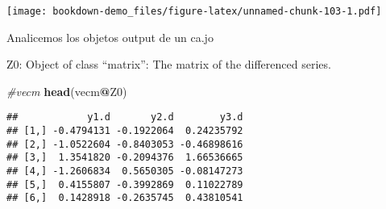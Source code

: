 \documentclass[]{book}
\newenvironment{Shaded}{\begin{snugshade}}{\end{snugshade}}
\newcommand{\KeywordTok}[1]{\textcolor[rgb]{0.13,0.29,0.53}{\textbf{#1}}}
\newcommand{\DataTypeTok}[1]{\textcolor[rgb]{0.13,0.29,0.53}{#1}}
\newcommand{\DecValTok}[1]{\textcolor[rgb]{0.00,0.00,0.81}{#1}}
\newcommand{\StringTok}[1]{\textcolor[rgb]{0.31,0.60,0.02}{#1}}
\newcommand{\CommentTok}[1]{\textcolor[rgb]{0.56,0.35,0.01}{\textit{#1}}}
\newcommand{\OperatorTok}[1]{\textcolor[rgb]{0.81,0.36,0.00}{\textbf{#1}}}
\newcommand{\NormalTok}[1]{#1}
\theoremstyle{definition}
\theoremstyle{definition}
\theoremstyle{definition}
\theoremstyle{remark}
\begin{document}
\begin{Shaded}
\end{Shaded}

\texttt{[image: bookdown-demo\_files/figure-latex/unnamed-chunk-103-1.pdf]}

Analicemos los objetos output de un ca.jo

Z0: Object of class ``matrix'': The matrix of the differenced series.

\begin{Shaded}
\begin{Highlighting}[]
\CommentTok{#vecm}
\KeywordTok{head}\NormalTok{(vecm}\OperatorTok{@}\NormalTok{Z0)}
\end{Highlighting}
\end{Shaded}

\begin{verbatim}
##            y1.d       y2.d        y3.d
## [1,] -0.4794131 -0.1922064  0.24235792
## [2,] -1.0522604 -0.8403053 -0.46898616
## [3,]  1.3541820 -0.2094376  1.66536665
## [4,] -1.2606834  0.5650305 -0.08147273
## [5,]  0.4155807 -0.3992869  0.11022789
## [6,]  0.1428918 -0.2635745  0.43810541
\end{verbatim}
\end{document}

